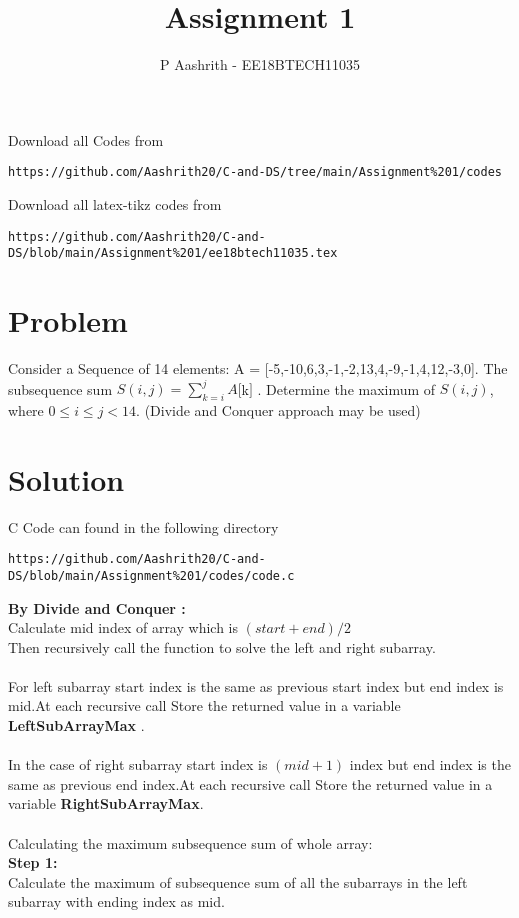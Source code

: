 \documentclass[journal,12pt,twocolumn]{IEEEtran}
\begin{document}
     \def\rightbox#1{\makebox[0in][r]{#1}}
     \def\centbox#1{\makebox[0in]{#1}}
     \def\topbox#1{\raisebox{-\baselineskip}[0in][0in]{#1}}
     \def\midbox#1{\raisebox{-0.5\baselineskip}[0in][0in]{#1}}
\vspace{3cm}
\title{Assignment 1}
\author{P Aashrith - EE18BTECH11035}
\maketitle
\newpage
\bigskip
\renewcommand{\thefigure}{\theenumi}
\renewcommand{\thetable}{\theenumi}
Download all Codes from 
%
\begin{lstlisting}
https://github.com/Aashrith20/C-and-DS/tree/main/Assignment%201/codes
\end{lstlisting}
Download all latex-tikz codes from 
\begin{lstlisting}
https://github.com/Aashrith20/C-and-DS/blob/main/Assignment%201/ee18btech11035.tex
\end{lstlisting}
\section{Problem}
Consider a Sequence of 14 elements: A = [-5,-10,6,3,-1,-2,13,4,-9,-1,4,12,-3,0]. The subsequence sum  $ S(i,j) =  \sum_{k=i}^{j} A[$k$]$ . Determine the maximum of $S(i,j)$, where $0\leq i\leq j < 14$. (Divide and Conquer approach may be used)
\section{Solution}
C Code can found in the following directory
\begin{lstlisting}
https://github.com/Aashrith20/C-and-DS/blob/main/Assignment%201/codes/code.c
\end{lstlisting}
\textbf{By Divide and Conquer :}\\
Calculate mid index of array which is $(start+end)/2$ \\
Then recursively call the function to solve the left and right subarray.\\
\\
For left subarray start index is the same as previous start index but end index is mid.At each recursive call Store the returned value in a variable \textbf{LeftSubArrayMax}  .\\
\\
In the case of right subarray start index is $(mid+1)$ index but end index is the same as previous end index.At each recursive call Store the returned value in a variable \textbf{RightSubArrayMax}.\\
\\
Calculating the maximum subsequence sum of whole array:\\
\textbf{Step 1:}\\
Calculate the maximum of subsequence sum of all the subarrays in the left subarray with ending index as mid.
\end{document}
